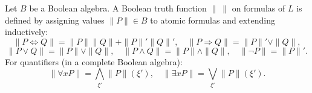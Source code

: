 Let $B$ be a Boolean algebra. A Boolean truth function $\|~\|$ on formulas of $L$ is defined by assigning values $\|P\| \in B$ to atomic formulas and extending inductively:
$$\|P \Leftrightarrow Q\| = \|P\|\|Q\| + \|P\|'\|Q\|', \quad \|P \Rightarrow Q\| = \|P\|' \lor \|Q\|,$$
$$\|P \lor Q\| = \|P\| \lor \|Q\|, \quad \|P \land Q\| = \|P\| \land \|Q\|, \quad \|\neg P\| = \|P\|'.$$
For quantifiers (in a complete Boolean algebra):
$$\|\forall x P\| = \bigwedge_{\xi'} \|P\|(\xi'), \quad \|\exists x P\| = \bigvee_{\xi'} \|P\|(\xi').$$
